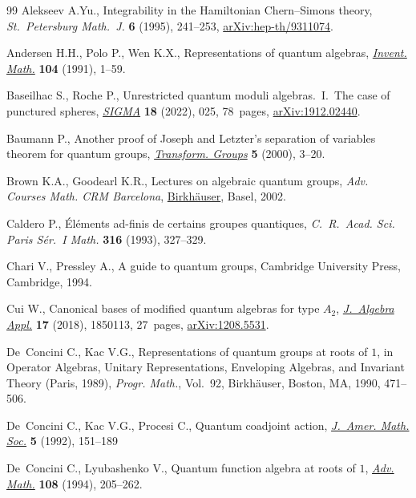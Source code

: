 \documentclass[11pt]{article}
\numberwithin{equation}{section}
\numberwithin{equation}{section}
\theoremstyle{definition}
\begin{document}
\begin{thebibliography}{99}
Alekseev A.Yu., Integrability in the {H}amiltonian {C}hern--{S}imons theory,
 \textit{St.~Petersburg Math.~J.} \textbf{6} (1995), 241--253,
 \href{https://arxiv.org/abs/hep-th/9311074}{arXiv:hep-th/9311074}.

Andersen H.H., Polo P., Wen K.X., Representations of quantum algebras,
 \href{https://doi.org/10.1007/BF01245066}{\textit{Invent. Math.}} \textbf{104} (1991), 1--59.

Baseilhac S., Roche P., Unrestricted quantum moduli algebras.~{I}.~{T}he case
 of punctured spheres, \href{https://doi.org/10.3842/SIGMA.2022.025}{\textit{SIGMA}} \textbf{18} (2022), 025, 78~pages,
 \href{https://arxiv.org/abs/1912.02440}{arXiv:1912.02440}.

Baumann P., Another proof of {J}oseph and {L}etzter's separation of variables
 theorem for quantum groups, \href{https://doi.org/10.1007/BF01237175}{\textit{Transform. Groups}} \textbf{5} (2000),
 3--20.

Brown K.A., Goodearl K.R., Lectures on algebraic quantum groups, \textit{Adv. Courses Math. CRM Barcelona}, \href{https://doi.org/10.1007/978-3-0348-8205-7}{Birkh\"auser}, Basel, 2002.

Caldero P., \'El\'ements ad-finis de certains groupes quantiques,
 \textit{C.~R.~Acad. Sci. Paris S\'er.~I Math.} \textbf{316} (1993), 327--329.

Chari V., Pressley A., A guide to quantum groups, Cambridge University Press,
 Cambridge, 1994.

Cui W., Canonical bases of modified quantum algebras for type {$A_2$},
 \href{https://doi.org/10.1142/S021949881850113X}{\textit{J.~Algebra Appl.}} \textbf{17} (2018), 1850113, 27~pages,
 \href{https://arxiv.org/abs/1208.5531}{arXiv:1208.5531}.

De~Concini C., Kac V.G., Representations of quantum groups at roots of {$1$},
 in Operator {A}lgebras, {U}nitary {R}epresentations, {E}nveloping {A}lgebras,
 and {I}nvariant {T}heory ({P}aris, 1989), \textit{Progr. Math.}, Vol.~92,
 Birkh\"auser, Boston, MA, 1990, 471--506.

De~Concini C., Kac V.G., Procesi C., Quantum coadjoint action, \href{https://doi.org/10.2307/2152754}{\textit{J.~Amer.
 Math. Soc.}} \textbf{5} (1992), 151--189

De~Concini C., Lyubashenko V., Quantum function algebra at roots of {$1$},
 \href{https://doi.org/10.1006/aima.1994.1071}{\textit{Adv. Math.}} \textbf{108} (1994), 205--262.


\end{thebibliography}
\end{document}
